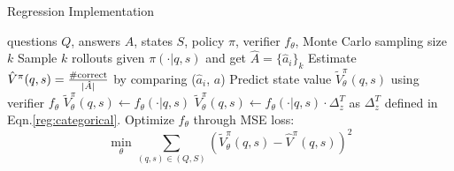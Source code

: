 \begin{algorithm}[tb]
   \caption{Regression Implementation}\label{alg:reg}
\begin{algorithmic}[1]\label{alg:reg}
    questions $Q$, answers $A$, states $S$, policy $\pi$, verifier $f_\theta$, Monte Carlo sampling size $k$
   \STATE Sample $k$ rollouts given $\pi(\cdot|q,s)$ and get $\hat{A}=\{\hat{a}_i\}_k$
   \STATE Estimate $\hat{V}^\pi(q,s)=\frac{\#\rm correct}{|\hat{A}|}$ by comparing ($\hat{a}_i$, $a$)
   \STATE Predict state value $\tilde{V}_\theta^\pi(q,s)$ using verifier $f_\theta$
    \STATE $\tilde{V}_\theta^\pi(q,s)\leftarrow f_\theta(\cdot|q,s)$
    \STATE $\tilde{V}_\theta^\pi(q,s)\leftarrow f_\theta(\cdot|q,s)\cdot\Delta_z^T$ 
    as $\Delta_z^T$ defined in Eqn.\ref{reg:categorical}.
    \ENDIF
   \ENDFOR
   \STATE Optimize $f_\theta$ through MSE loss:
   \begin{equation}
       \min_\theta \sum_{(q,s)\in (Q,S)}(\tilde{V}_\theta^\pi(q,s)-\hat{V}^\pi(q,s))^2 \nonumber
   \end{equation}
\end{algorithmic}
\end{algorithm}
